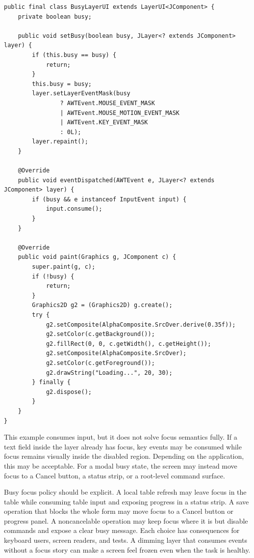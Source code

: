 \begin{lstlisting}[caption={A LayerUI that dims a subtree and consumes input while busy.}]
public final class BusyLayerUI extends LayerUI<JComponent> {
    private boolean busy;

    public void setBusy(boolean busy, JLayer<? extends JComponent> layer) {
        if (this.busy == busy) {
            return;
        }
        this.busy = busy;
        layer.setLayerEventMask(busy
                ? AWTEvent.MOUSE_EVENT_MASK
                | AWTEvent.MOUSE_MOTION_EVENT_MASK
                | AWTEvent.KEY_EVENT_MASK
                : 0L);
        layer.repaint();
    }

    @Override
    public void eventDispatched(AWTEvent e, JLayer<? extends JComponent> layer) {
        if (busy && e instanceof InputEvent input) {
            input.consume();
        }
    }

    @Override
    public void paint(Graphics g, JComponent c) {
        super.paint(g, c);
        if (!busy) {
            return;
        }
        Graphics2D g2 = (Graphics2D) g.create();
        try {
            g2.setComposite(AlphaComposite.SrcOver.derive(0.35f));
            g2.setColor(c.getBackground());
            g2.fillRect(0, 0, c.getWidth(), c.getHeight());
            g2.setComposite(AlphaComposite.SrcOver);
            g2.setColor(c.getForeground());
            g2.drawString("Loading...", 20, 30);
        } finally {
            g2.dispose();
        }
    }
}
\end{lstlisting}

This example consumes input, but it does not solve focus semantics fully. If a text field inside the layer already has focus, key events may be consumed while focus remains visually inside the disabled region. Depending on the application, this may be acceptable. For a modal busy state, the screen may instead move focus to a Cancel button, a status strip, or a root-level command surface.

Busy focus policy should be explicit. A local table refresh may leave focus in
the table while consuming table input and exposing progress in a status strip.
A save operation that blocks the whole form may move focus to a Cancel button or
progress panel. A noncancelable operation may keep focus where it is but disable
commands and expose a clear busy message. Each choice has consequences for
keyboard users, screen readers, and tests. A dimming layer that consumes events
without a focus story can make a screen feel frozen even when the task is
healthy.

